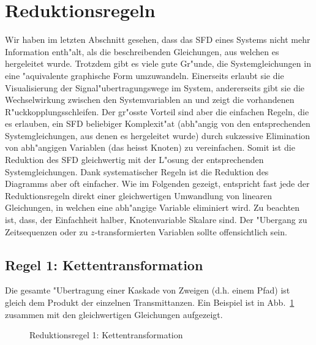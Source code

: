\section{Reduktionsregeln }\label{SFD_red_regeln} 
Wir haben im letzten Abschnitt gesehen, dass das SFD eines Systems
nicht mehr Information enth"alt, als die beschreibenden Gleichungen,
aus welchen es hergeleitet wurde.  Trotzdem gibt es viele gute
Gr"unde, die Systemgleichungen in eine "aquivalente graphische Form
umzuwandeln. Einerseits erlaubt sie die Visualisierung der
Signal"ubertragungswege im System, andererseits gibt sie die
Wechselwirkung zwischen den Systemvariablen 
an und zeigt die vorhandenen R"uckkopplungsschleifen. Der gr"osste
Vorteil sind aber die einfachen Regeln, die es erlauben, ein SFD
beliebiger Komplexit"at (abh"angig von den entsprechenden
Systemgleichungen, aus denen es hergeleitet wurde) durch sukzessive
Elimination  von abh"angigen Variablen
(das heisst Knoten) zu vereinfachen. Somit ist die Reduktion des SFD
gleichwertig mit der L"osung der entsprechenden Systemgleichungen.
Dank systematischer Regeln ist die Reduktion des Diagramms aber oft
einfacher.  Wie im Folgenden gezeigt, entspricht fast jede der
Reduktionsregeln direkt einer gleichwertigen Umwandlung von linearen
Gleichungen, in welchen eine abh"angige Variable eliminiert wird. Zu
beachten ist, dass, der Einfachheit halber, Knotenvariable Skalare
sind. Der "Ubergang zu Zeitsequenzen oder zu $z$-transformierten
Variablen sollte offensichtlich sein.
\subsection{Regel 1:  Kettentransformation } 
Die gesamte "Ubertragung einer Kaskade  von Zweigen
(d.h. einem Pfad) ist gleich dem Produkt der einzelnen Transmittanzen.
Ein Beispiel ist in Abb.~\ref{SFD7} zusammen mit den gleichwertigen
Gleichungen aufgezeigt. \\
\begin{figure}[htb!]
\vspace*{-3mm}\begin{center}
  \caption{Reduktionsregel 1:
Kettentransformation}\label{SFD7}
\end{center}
\vspace*{-7mm}
\end{figure}
